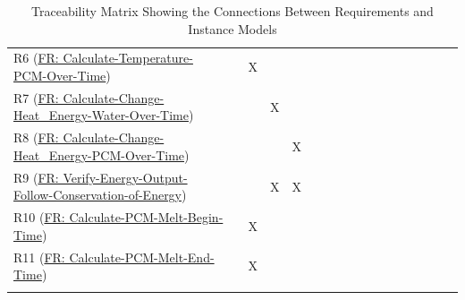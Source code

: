 \documentclass[12pt]{article}
\begin{document}
\begin{longtable}{l l l l l l l l l l l l l l l l l}
\\
R6 (\hyperref[calcTempPCMOverTime]{FR: Calculate-Temperature-PCM-Over-Time}) &  & X &  &  &  &  &  &  &  &  &  &  &  &  &  & 
\\
R7 (\hyperref[calcChgHeatEnergyWtrOverTime]{FR: Calculate-Change-Heat\_Energy-Water-Over-Time}) &  &  & X &  &  &  &  &  &  &  &  &  &  &  &  & 
\\
R8 (\hyperref[calcChgHeatEnergyPCMOverTime]{FR: Calculate-Change-Heat\_Energy-PCM-Over-Time}) &  &  &  & X &  &  &  &  &  &  &  &  &  &  &  & 
\\
R9 (\hyperref[verifyEnergyOutput]{FR: Verify-Energy-Output-Follow-Conservation-of-Energy}) &  &  & X & X &  &  &  &  &  &  &  &  &  &  &  & 
\\
R10 (\hyperref[calcPCMMeltBegin]{FR: Calculate-PCM-Melt-Begin-Time}) &  & X &  &  &  &  &  &  &  &  &  &  &  &  &  & 
\\
R11 (\hyperref[calcPCMMeltEnd]{FR: Calculate-PCM-Melt-End-Time}) &  & X &  &  &  &  &  &  &  &  &  &  &  &  &  & 
\\
\bottomrule
\caption{Traceability Matrix Showing the Connections Between Requirements and Instance Models}
\label{Table:Tracey1}
\end{longtable}
\end{document}

